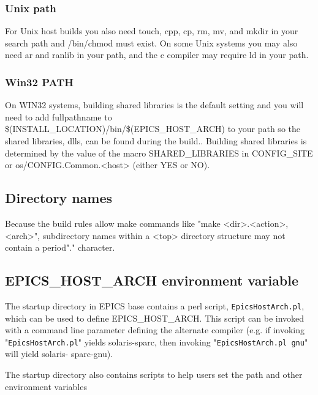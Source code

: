 \subsubsection{Unix path}

For Unix host builds you also need touch, cpp, cp, rm, mv, and mkdir in your search path and /bin/chmod must exist. On 
some Unix systems you may also need ar and ranlib in your path, and the c compiler may require ld in your path.

\subsubsection{Win32 PATH}

On WIN32 systems, building shared libraries is the default setting and you will need to add fullpathname to 
\$(INSTALL\_LOCATION)/bin/\$(EPICS\_HOST\_ARCH) to your path so the shared libraries, dlls, can be found during 
the build.. Building shared libraries is determined by the value of the macro SHARED\_LIBRARIES in CONFIG\_SITE or 
os/CONFIG.Common.\textless{}host\textgreater{} (either YES or NO).

\subsection{Directory names}

Because the build rules allow make commands like "make \textless{}dir\textgreater{}.\textless{}action\textgreater{},\textless{}arch\textgreater{}", subdirectory names within a \textless{}top\textgreater{} 
directory structure may not contain a period"." character.

\subsection{EPICS\_HOST\_ARCH environment variable}

The startup directory in EPICS base contains a perl script, \verb|EpicsHostArch.pl|, which can be used to define 
EPICS\_HOST\_ARCH. This script can be invoked with a command line parameter defining the alternate compiler (e.g. if 
invoking "\verb|EpicsHostArch.pl|" yields solaris-sparc, then invoking "\verb|EpicsHostArch.pl gnu|" will yield solaris-
sparc-gnu).

The startup directory also contains scripts to help users set the path and other environment variables

